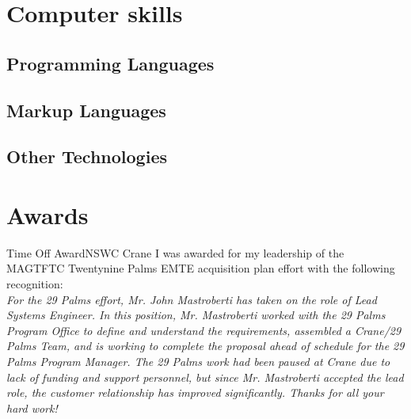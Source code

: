 \documentclass[11pt,a4paper,sans]{moderncv}        %
\begin{document}
\section{Computer skills}

\subsection{Programming Languages}%


\subsection{Markup Languages}


\subsection{Other Technologies}

\section{Awards}

{Time Off Award}{NSWC Crane}{}{
I was awarded for my leadership of the MAGTFTC Twentynine Palms EMTE acquisition plan effort with the following recognition:
\\
\textit{For the 29 Palms effort, Mr. John Mastroberti has taken on the role of Lead Systems Engineer.
In this position, Mr. Mastroberti worked with the 29 Palms Program Office to define and understand the requirements, assembled a Crane/29 Palms Team, and is working to complete the proposal ahead of schedule for the 29 Palms Program Manager.
The 29 Palms work had been paused at Crane due to lack of funding and support personnel, but since Mr. Mastroberti accepted the lead role, the customer relationship has improved significantly.
Thanks for all your hard work!}
}
\end{document}
